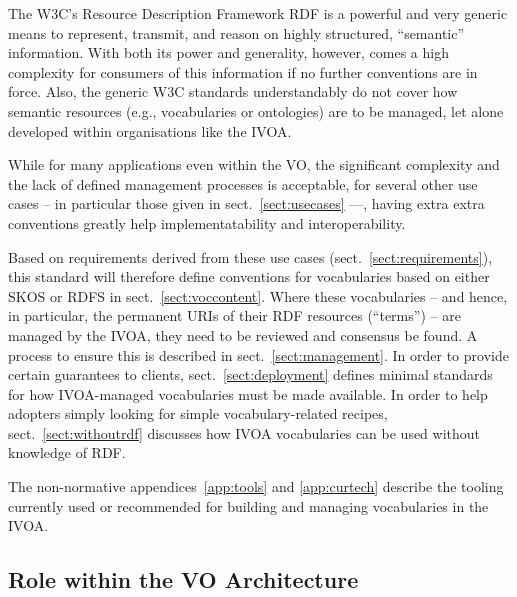 \documentclass[11pt,a4paper]{ivoa}
\begin{document}
The W3C's Resource Description Framework RDF \citep{note:rdfprimer} is a powerful
and very generic means to represent, transmit, and reason on highly
structured, ``semantic'' information.  With both its power and
generality, however, comes a high complexity for consumers of this
information if no further conventions are in force.  Also, the generic
W3C standards understandably do not cover how semantic resources (e.g.,
vocabularies or ontologies) are to be managed, let alone developed
within organisations like the IVOA.

While for many applications even within the VO, the significant
complexity and the lack of defined management processes is acceptable, 
for several other use cases -- in particular those given in
sect.~\ref{sect:usecases} ––, having extra extra conventions greatly
help implementatability and interoperability.

Based on requirements derived from these use cases 
(sect.~\ref{sect:requirements}), this standard will therefore define
conventions for
vocabularies based on either SKOS or RDFS in
sect.~\ref{sect:voccontent}.  Where these vocabularies -- and hence, in
particular, the permanent URIs of their RDF resources (``terms'') 
-- are managed by the
IVOA, they need to be reviewed and consensus be found.  A process to
ensure this is described in
sect.~\ref{sect:management}.  In order
to provide certain guarantees to clients, sect.~\ref{sect:deployment}
defines minimal standards for how IVOA-managed vocabularies must be made
available.  In order to help adopters simply looking for simple
vocabulary-related recipes, sect.~\ref{sect:withoutrdf} discusses how IVOA
vocabularies can be used without knowledge of RDF.

The non-normative appendices~\ref{app:tools} and \ref{app:curtech} 
describe the tooling
currently used or recommended for building and managing vocabularies in the
IVOA.


\subsection{Role within the VO Architecture}
\end{document}
